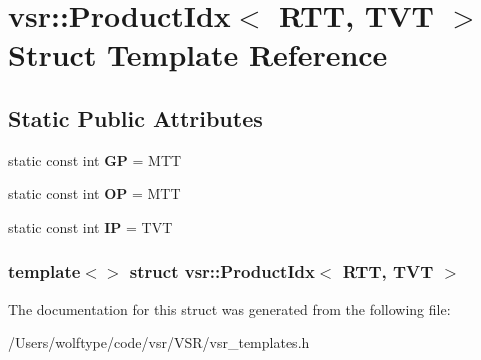 \hypertarget{structvsr_1_1_product_idx_3_01_r_t_t_00_01_t_v_t_01_4}{\section{vsr\-:\-:Product\-Idx$<$ R\-T\-T, T\-V\-T $>$ Struct Template Reference}
\label{structvsr_1_1_product_idx_3_01_r_t_t_00_01_t_v_t_01_4}
}
\subsection*{Static Public Attributes}
\begin{DoxyCompactItemize}
\item 
\hypertarget{structvsr_1_1_product_idx_3_01_r_t_t_00_01_t_v_t_01_4_abddec7c04fea75a85bda9741644244e2}{static const int {\bfseries G\-P} = M\-T\-T}\label{structvsr_1_1_product_idx_3_01_r_t_t_00_01_t_v_t_01_4_abddec7c04fea75a85bda9741644244e2}

\item 
\hypertarget{structvsr_1_1_product_idx_3_01_r_t_t_00_01_t_v_t_01_4_a9265f99a08acaeb452dc87857555b521}{static const int {\bfseries O\-P} = M\-T\-T}\label{structvsr_1_1_product_idx_3_01_r_t_t_00_01_t_v_t_01_4_a9265f99a08acaeb452dc87857555b521}

\item 
\hypertarget{structvsr_1_1_product_idx_3_01_r_t_t_00_01_t_v_t_01_4_ad2b2fc57f0b1ff469208d7349423462f}{static const int {\bfseries I\-P} = T\-V\-T}\label{structvsr_1_1_product_idx_3_01_r_t_t_00_01_t_v_t_01_4_ad2b2fc57f0b1ff469208d7349423462f}

\end{DoxyCompactItemize}
\subsubsection*{template$<$$>$ struct vsr\-::\-Product\-Idx$<$ R\-T\-T, T\-V\-T $>$}



The documentation for this struct was generated from the following file\-:\begin{DoxyCompactItemize}
\item 
/\-Users/wolftype/code/vsr/\-V\-S\-R/vsr\-\_\-templates.\-h\end{DoxyCompactItemize}
